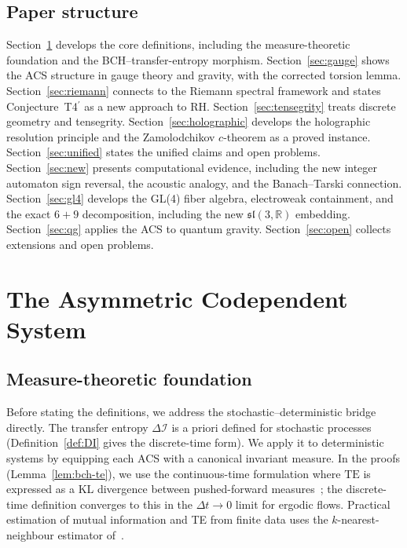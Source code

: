 \documentclass[12pt,a4paper]{article}
\theoremstyle{plain}
\theoremstyle{definition}
\theoremstyle{remark}
\newcommand{\DI}{\Delta\mathcal{I}}
\newcommand{\TE}{\mathrm{TE}}
\begin{document}
\subsection{Paper structure}

Section~\ref{sec:acs} develops the core definitions, including the measure-theoretic foundation and the BCH--transfer-entropy morphism.
Section~\ref{sec:gauge} shows the ACS structure in gauge theory and gravity, with the corrected torsion lemma.
Section~\ref{sec:riemann} connects to the Riemann spectral framework and states Conjecture~T4$^\prime$ as a new approach to RH.
Section~\ref{sec:tensegrity} treats discrete geometry and tensegrity.
Section~\ref{sec:holographic} develops the holographic resolution principle and the Zamolodchikov $c$-theorem as a proved instance.
Section~\ref{sec:unified} states the unified claims and open problems.
Section~\ref{sec:new} presents computational evidence, including the new integer automaton sign reversal, the acoustic analogy, and the Banach–Tarski connection.
Section~\ref{sec:gl4} develops the GL(4) fiber algebra, electroweak containment, and the exact $6+9$ decomposition, including the new $\mathfrak{sl}(3,\mathbb{R})$ embedding.
Section~\ref{sec:qg} applies the ACS to quantum gravity.
Section~\ref{sec:open} collects extensions and open problems.

\section{The Asymmetric Codependent System}
\label{sec:acs}

\subsection{Measure-theoretic foundation}

Before stating the definitions, we address the stochastic--deterministic
bridge directly.  The transfer entropy $\DI$ is a priori defined for stochastic
processes (Definition~\ref{def:DI} gives the discrete-time form).
We apply it to deterministic systems by equipping each ACS with a
canonical invariant measure.  In the proofs (Lemma~\ref{lem:bch-te}),
we use the continuous-time formulation where $\TE$ is expressed as a
KL divergence between pushed-forward measures~\cite{Schreiber2000,Bossomaier2016};
the discrete-time definition converges to this in the $\Delta t \to 0$ limit
for ergodic flows.  Practical estimation of mutual information and TE
from finite data uses the $k$-nearest-neighbour estimator of~\cite{Kraskov2004}.
\end{document}
